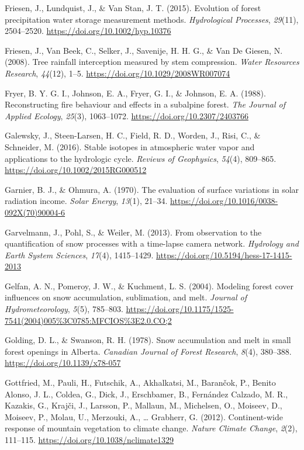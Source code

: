 \documentclass[
  letterpaper,
]{tex/uofsthesis-cs}
\newlength{\cslhangindent}
\newenvironment{CSLReferences}[2] %
 {\begin{list}{}{%
  \setlength{\itemindent}{0pt}
  \setlength{\leftmargin}{0pt}
  \setlength{\parsep}{0pt}
  \ifodd #1
   \setlength{\leftmargin}{\cslhangindent}
   \setlength{\itemindent}{-1\cslhangindent}
  \fi
  \setlength{\itemsep}{#2\baselineskip}}}
 {\end{list}}
\begin{document}
\begin{CSLReferences}{1}{0}
Friesen, J., Lundquist, J., \& Van Stan, J. T. (2015). Evolution of
forest precipitation water storage measurement methods.
\emph{Hydrological Processes}, \emph{29}(11), 2504--2520.
\url{https://doi.org/10.1002/hyp.10376}

Friesen, J., Van Beek, C., Selker, J., Savenije, H. H. G., \& Van De
Giesen, N. (2008). Tree rainfall interception measured by stem
compression. \emph{Water Resources Research}, \emph{44}(12), 1--5.
\url{https://doi.org/10.1029/2008WR007074}

Fryer, B. Y. G. I., Johnson, E. A., Fryer, G. I., \& Johnson, E. A.
(1988). Reconstructing fire behaviour and effects in a subalpine forest.
\emph{The Journal of Applied Ecology}, \emph{25}(3), 1063--1072.
\url{https://doi.org/10.2307/2403766}

Galewsky, J., Steen-Larsen, H. C., Field, R. D., Worden, J., Risi, C.,
\& Schneider, M. (2016). Stable isotopes in atmospheric water vapor and
applications to the hydrologic cycle. \emph{Reviews of Geophysics},
\emph{54}(4), 809--865. \url{https://doi.org/10.1002/2015RG000512}

Garnier, B. J., \& Ohmura, A. (1970). The evaluation of surface
variations in solar radiation income. \emph{Solar Energy}, \emph{13}(1),
21--34. \url{https://doi.org/10.1016/0038-092X(70)90004-6}

Garvelmann, J., Pohl, S., \& Weiler, M. (2013). From observation to the
quantification of snow processes with a time-lapse camera network.
\emph{Hydrology and Earth System Sciences}, \emph{17}(4), 1415--1429.
\url{https://doi.org/10.5194/hess-17-1415-2013}

Gelfan, A. N., Pomeroy, J. W., \& Kuchment, L. S. (2004). Modeling
forest cover influences on snow accumulation, sublimation, and melt.
\emph{Journal of Hydrometeorology}, \emph{5}(5), 785--803.
\url{https://doi.org/10.1175/1525-7541(2004)005\%3C0785:MFCIOS\%3E2.0.CO;2}

Golding, D. L., \& Swanson, R. H. (1978). Snow accumulation and melt in
small forest openings in {Alberta}. \emph{Canadian Journal of Forest
Research}, \emph{8}(4), 380--388. \url{https://doi.org/10.1139/x78-057}

Gottfried, M., Pauli, H., Futschik, A., Akhalkatsi, M., Barančok, P.,
Benito Alonso, J. L., Coldea, G., Dick, J., Erschbamer, B., Fernández
Calzado, M. R., Kazakis, G., Krajči, J., Larsson, P., Mallaun, M.,
Michelsen, O., Moiseev, D., Moiseev, P., Molau, U., Merzouki, A.,
\ldots{} Grabherr, G. (2012). Continent-wide response of mountain
vegetation to climate change. \emph{Nature Climate Change}, \emph{2}(2),
111--115. \url{https://doi.org/10.1038/nclimate1329}


\end{CSLReferences}
\end{document}
